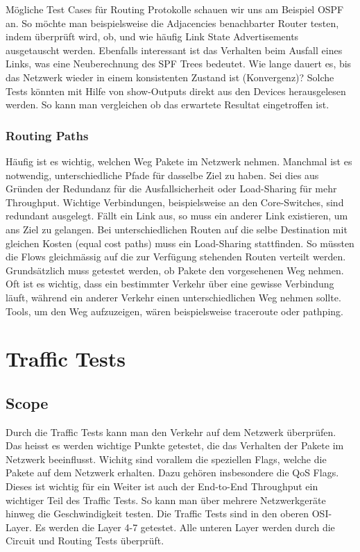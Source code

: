 \documentclass[a4,12pt]{scrartcl}
\begin{document}
\noindent Mögliche Test Cases für Routing Protokolle schauen wir uns am Beispiel OSPF an. So möchte man beispielsweise die Adjacencies benachbarter Router testen, indem überprüft wird, ob, und wie häufig Link State Advertisements ausgetauscht werden. Ebenfalls interessant ist das Verhalten beim Ausfall eines Links, was eine Neuberechnung des SPF Trees bedeutet. Wie lange dauert es, bis das Netzwerk wieder in einem konsistenten Zustand ist (Konvergenz)? Solche Tests könnten mit Hilfe von show-Outputs direkt aus den Devices herausgelesen werden. So kann man vergleichen ob das erwartete Resultat eingetroffen ist. 
\subsubsection{Routing Paths}
Häufig ist es wichtig, welchen Weg Pakete im Netzwerk nehmen. Manchmal ist es notwendig, unterschiedliche Pfade für dasselbe Ziel zu haben. Sei dies aus Gründen der Redundanz für die Ausfallsicherheit oder Load-Sharing für mehr Throughput. Wichtige Verbindungen, beispielsweise an den Core-Switches, sind redundant ausgelegt. Fällt ein Link aus, so muss ein anderer Link existieren, um ans Ziel zu gelangen. Bei unterschiedlichen Routen auf die selbe Destination mit gleichen Kosten (equal cost paths) muss ein Load-Sharing stattfinden. So müssten die Flows gleichmässig auf die zur Verfügung stehenden Routen verteilt werden.\\

\noindent Grundsätzlich muss getestet werden, ob Pakete den vorgesehenen Weg nehmen. Oft ist es wichtig, dass ein bestimmter Verkehr über eine gewisse Verbindung läuft, während ein anderer Verkehr einen unterschiedlichen Weg nehmen sollte.\\

\noindent Tools, um den Weg aufzuzeigen, wären beispielsweise traceroute oder pathping.  
\section{Traffic Tests}
\subsection{Scope}
Durch die Traffic Tests kann man den Verkehr auf dem Netzwerk überprüfen. Das heisst es werden wichtige Punkte getestet, die das Verhalten der Pakete im Netzwerk beeinflusst. Wichitg sind vorallem die speziellen Flags, welche die Pakete auf dem Netzwerk erhalten. Dazu gehören insbesondere die QoS Flags. Dieses ist wichtig für ein \newline
Weiter ist auch der End-to-End Throughput ein wichtiger Teil des Traffic Tests. So kann man über mehrere Netzwerkgeräte hinweg die Geschwindigkeit testen.\newline\newline
Die Traffic Tests sind in den oberen OSI-Layer. Es werden die Layer 4-7 getestet. Alle unteren Layer werden durch die Circuit und Routing Tests überprüft.
\end{document}
